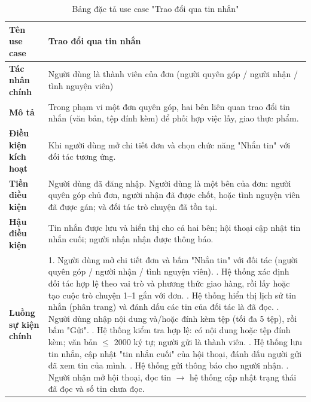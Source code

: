 \documentclass[../main.tex]{subfiles}%
\begin{document}
\begingroup
\renewcommand{\arraystretch}{1.5}
\begin{longtable}{|p{3.5cm}|p{11.5cm}|}
\caption{Bảng đặc tả use case "Trao đổi qua tin nhắn"}
\label{tab:usecase_trao_doi_tin_nhan}\\
\hline

\textbf{Tên use case} & Trao đổi qua tin nhắn \\ \hline
\textbf{Tác nhân chính} & Người dùng là thành viên của đơn (người quyên góp / người nhận / tình nguyện viên) \\ \hline
\textbf{Mô tả} & Trong phạm vi một đơn quyên góp, hai bên liên quan trao đổi tin nhắn (văn bản, tệp đính kèm) để phối hợp việc lấy, giao thực phẩm. \\ \hline
\textbf{Điều kiện kích hoạt} & Khi người dùng mở chi tiết đơn và chọn chức năng "Nhắn tin" với đối tác tương ứng. \\ \hline
\textbf{Tiền điều kiện} & Người dùng đã đăng nhập. \newline Người dùng là một bên của đơn: người quyên góp chủ đơn, người nhận đã được chốt, hoặc tình nguyện viên đã được gán; và đối tác trò chuyện đã tồn tại. \\ \hline
\textbf{Hậu điều kiện} & Tin nhắn được lưu và hiển thị cho cả hai bên; hội thoại cập nhật tin nhắn cuối; người nhận nhận được thông báo.\\ \hline
\textbf{Luồng sự kiện chính} &
1. Người dùng mở chi tiết đơn và bấm "Nhắn tin" với đối tác (người quyên góp / người nhận / tình nguyện viên). \newline
2. Hệ thống xác định đối tác hợp lệ theo vai trò và phương thức giao hàng, rồi lấy hoặc tạo cuộc trò chuyện 1–1 gắn với đơn. \newline
3. Hệ thống hiển thị lịch sử tin nhắn (phân trang) và đánh dấu các tin của đối tác là đã đọc. \newline
4. Người dùng nhập nội dung và/hoặc đính kèm tệp (tối đa 5 tệp), rồi bấm "Gửi". \newline
5. Hệ thống kiểm tra hợp lệ: có nội dung hoặc tệp đính kèm; văn bản $\le$ 2000 ký tự; người gửi là thành viên. \newline
6. Hệ thống lưu tin nhắn, cập nhật "tin nhắn cuối" của hội thoại, đánh dấu người gửi đã xem tin của mình. \newline
7. Hệ thống gửi thông báo cho người nhận. \newline
8. Người nhận mở hội thoại, đọc tin $\rightarrow$ hệ thống cập nhật trạng thái đã đọc và số tin chưa đọc. \\ \hline

\end{longtable}
\end{document}

